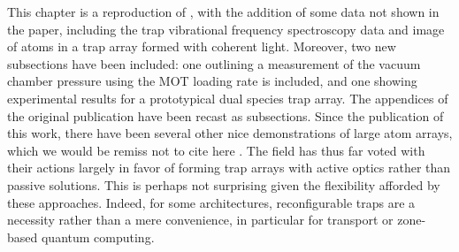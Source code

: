 

This chapter is a reproduction of \cite{PHuft2022}, with the addition of some data not shown in the paper, including the trap vibrational frequency spectroscopy data and image of atoms in a trap array formed with coherent light. Moreover, two new subsections have been included: one outlining a measurement of the vacuum chamber pressure using the MOT loading rate is included, and one showing experimental results for a prototypical dual species trap array. The appendices of the original publication have been recast as subsections. Since the publication of this work, there have been several other nice demonstrations of large atom arrays, which we would be remiss not to cite here \cite{manetsch2024,Pause2024,gyger2024continuous}. The field has thus far voted with their actions largely in favor of forming trap arrays with active optics rather than passive solutions. This is perhaps not surprising given the flexibility afforded by these approaches. Indeed, for some architectures, reconfigurable traps are a necessity rather than a mere convenience, in particular for transport or zone-based quantum computing\cite{Bluvstein2022,li2024high}.


